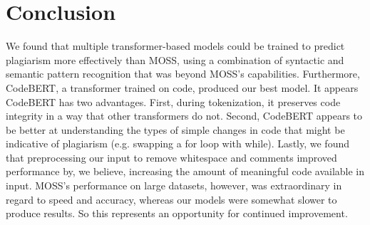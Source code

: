 \documentclass[twocolumn]{article}
\begin{document}
\begin{table}[ht]
\centering
\captionsetup{font=small}
\caption{\textsc{CodeBERT Ablation}}
\fontsize{20}{24}\selectfont 
\label{table:codebertablation}
\end{table}


\section{\large Conclusion}

We found that multiple transformer-based models could be trained to predict plagiarism more effectively than MOSS, using a combination of syntactic and semantic pattern recognition that was beyond MOSS's capabilities. Furthermore, CodeBERT, a transformer trained on code, produced our best model. It appears CodeBERT has two advantages. First, during tokenization, it preserves code integrity in a way that other transformers do not. Second, CodeBERT appears to be better at understanding the types of simple changes in code that might be indicative of plagiarism (e.g. swapping a for loop with while). Lastly, we found that preprocessing our input to remove whitespace and comments improved performance by, we believe, increasing the amount of meaningful code available in input. MOSS's performance on large datasets, however, was extraordinary in regard to speed and accuracy, whereas our models were somewhat slower to produce results. So this represents an opportunity for continued improvement. 
\end{document}
